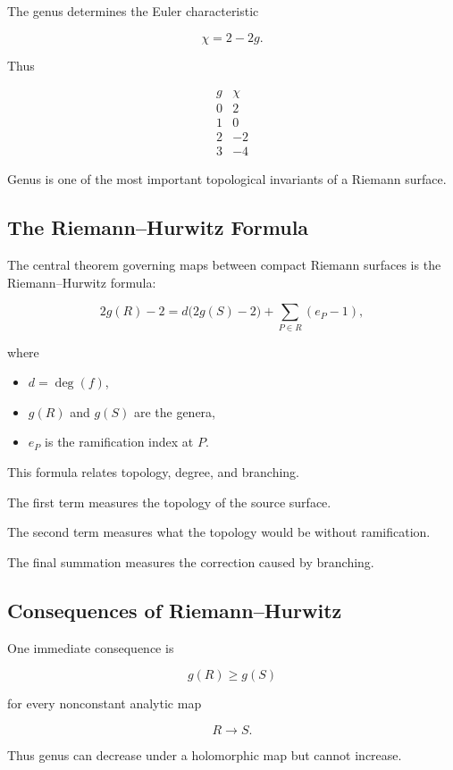 \documentclass[12pt,a4paper]{article}
\theoremstyle{notespace}
\begin{document}
The genus determines the Euler characteristic

\[
\chi=2-2g.
\]

Thus

\[
\begin{array}{c|c}
	g & \chi\\
	\hline
	0 & 2\\
	1 & 0\\
	2 & -2\\
	3 & -4
\end{array}
\]

Genus is one of the most important topological invariants of a Riemann surface.

\subsection{The Riemann--Hurwitz Formula}

The central theorem governing maps between compact Riemann surfaces is the Riemann--Hurwitz formula:

\[
2g(R)-2
=
d\bigl(2g(S)-2\bigr)
+
\sum_{P\in R}(e_P-1),
\]

where

\begin{itemize}
	\item \(d=\deg(f)\),
	\item \(g(R)\) and \(g(S)\) are the genera,
	\item \(e_P\) is the ramification index at \(P\).
\end{itemize}

This formula relates topology, degree, and branching.

The first term measures the topology of the source surface.

The second term measures what the topology would be without ramification.

The final summation measures the correction caused by branching.

\subsection{Consequences of Riemann--Hurwitz}

One immediate consequence is

\[
g(R)\ge g(S)
\]

for every nonconstant analytic map

\[
R\to S.
\]

Thus genus can decrease under a holomorphic map but cannot increase.
\end{document}
